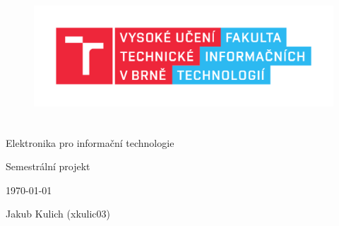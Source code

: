 \begin{titlepage}

\begin{figure}[!h]
  \centering
  \includegraphics[height=5cm]{res/logo}
\end{figure}

\vfill

\begin{center}
  \begin{Large}
    Elektronika pro informační technologie \\
  \end{Large}
  \bigskip
  \begin{Huge}
    Semestrální projekt
  \end{Huge}
\end{center}

\vfill

\begin{center}
  \begin{Large}
  \today
  \end{Large}
\end{center}

\vfill

\noindent
\begin{large}
    Jakub Kulich (xkulic03)
\end{large}


\end{titlepage}
